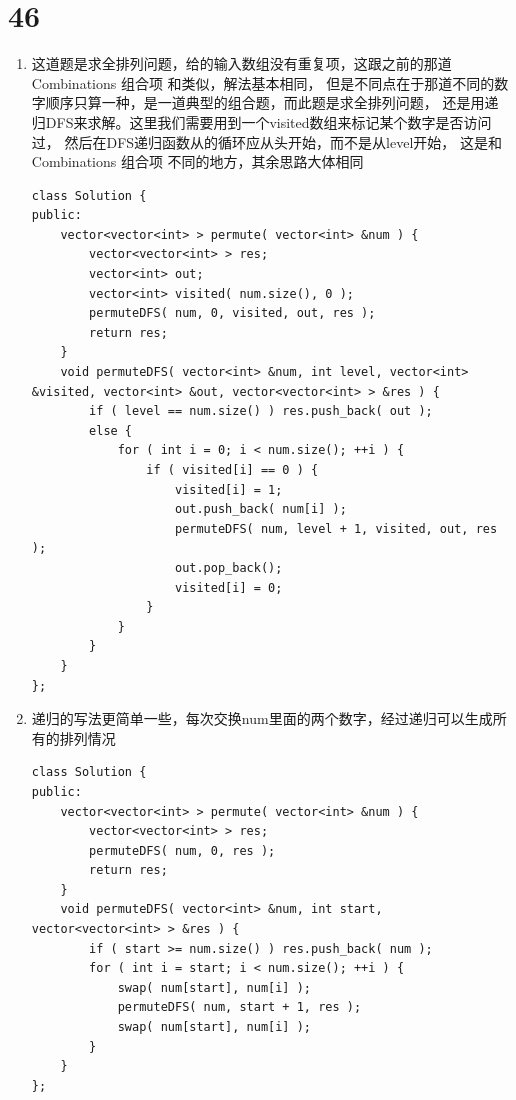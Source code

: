 \documentclass[12pt,a4paper]{article}
\begin{document}
\section{46}
\begin{enumerate}
\item
\begin{CJK}{UTF8}{gbsn}
这道题是求全排列问题，给的输入数组没有重复项，这跟之前的那道 Combinations 组合项 和类似，解法基本相同，
但是不同点在于那道不同的数字顺序只算一种，是一道典型的组合题，而此题是求全排列问题，
还是用递归DFS来求解。这里我们需要用到一个visited数组来标记某个数字是否访问过，
然后在DFS递归函数从的循环应从头开始，而不是从level开始，
这是和 Combinations 组合项 不同的地方，其余思路大体相同
\end{CJK}
\begin{lstlisting}
class Solution {
public:
	vector<vector<int> > permute( vector<int> &num ) {
		vector<vector<int> > res;
		vector<int> out;
		vector<int> visited( num.size(), 0 );
		permuteDFS( num, 0, visited, out, res );
		return res;
	}
	void permuteDFS( vector<int> &num, int level, vector<int> &visited, vector<int> &out, vector<vector<int> > &res ) {
		if ( level == num.size() ) res.push_back( out );
		else {
			for ( int i = 0; i < num.size(); ++i ) {
				if ( visited[i] == 0 ) {
					visited[i] = 1;
					out.push_back( num[i] );
					permuteDFS( num, level + 1, visited, out, res );
					out.pop_back();
					visited[i] = 0;
				}
			}
		}
	}
};
\end{lstlisting}
\item
\begin{CJK}{UTF8}{gbsn}
递归的写法更简单一些，每次交换num里面的两个数字，经过递归可以生成所有的排列情况
\end{CJK}
\begin{lstlisting}
class Solution {
public:
	vector<vector<int> > permute( vector<int> &num ) {
		vector<vector<int> > res;
		permuteDFS( num, 0, res );
		return res;
	}
	void permuteDFS( vector<int> &num, int start, vector<vector<int> > &res ) {
		if ( start >= num.size() ) res.push_back( num );
		for ( int i = start; i < num.size(); ++i ) {
			swap( num[start], num[i] );
			permuteDFS( num, start + 1, res );
			swap( num[start], num[i] );
		}
	}
};
\end{lstlisting}
\end{enumerate}
\end{document}
